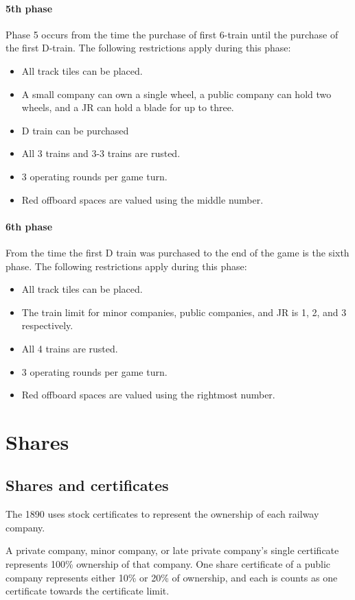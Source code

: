 \documentclass{article}
\begin{document}
\begin{CJK}{UTF8}{min}
\begin{multicols}{2}
\paragraph*{5th phase}
Phase 5 occurs from the time the purchase of first 6-train until the
purchase of the first D-train. The following restrictions apply during
this phase:
\begin{itemize}
\item All track tiles can be placed.
\item A small company can own a single wheel, a public company can
  hold two wheels, and a JR can hold a blade for up to three.
\item D train can be purchased
\item All 3 trains and 3-3 trains are rusted.
\item 3 operating rounds per game turn.
\item Red offboard spaces are valued using the middle number.
\end{itemize}

\paragraph*{6th phase}
From the time the first D train was purchased to the end of the game
is the sixth phase. The following restrictions apply during this
phase:
\begin{itemize}
\item All track tiles can be placed.
\item The train limit for minor companies, public companies, and JR is
  1, 2, and 3 respectively.
\item All 4 trains are rusted.
\item 3 operating rounds per game turn.
\item Red offboard spaces are valued using the rightmost number.
\end{itemize}


\section{Shares}

\subsection{Shares and certificates}
The 1890 uses stock certificates to represent the ownership of each railway
company.

A private company, minor company, or late private company's single
certificate represents 100\% ownership of that company. One share
certificate of a public company represents either  10\% or 20\% of ownership, and
each is counts as one certificate towards the certificate limit.


\end{multicols}
\end{CJK}
\end{document}
